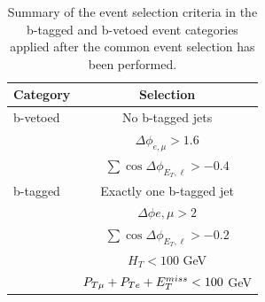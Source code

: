 \begin{table}[!t]
  \begin{center}
    \caption{Summary of the event selection criteria in the b-tagged and b-vetoed event categories applied after the common 
	event selection has been performed.}
    \begin{tabular}{p{4cm}c}
      \hline \hline
      Category & Selection \\ [3pt]
      \hline
      b-vetoed &  No b-tagged jets \\	
      & $\Delta\phi_{e,\mu}>1.6$ \\
      & $\sum\cos\Delta\phi_{E_{T},\ell} > -0.4$ \\[5pt]
      \hline
      b-tagged & Exactly one b-tagged  jet \\
      & $\Delta\phi{e,\mu}>2$ \\
      & $\sum\cos\Delta\phi_{E_{T},\ell} > -0.2$ \\
      & $ H_T < 100$ GeV \\
      & $P_{T\mu} + P_{Te} + E_{T}^{miss} < 100$ GeV \\[3pt]
      \hline \hline
    \end{tabular}
    \label{tab:sel}
  \end{center}
\end{table}

